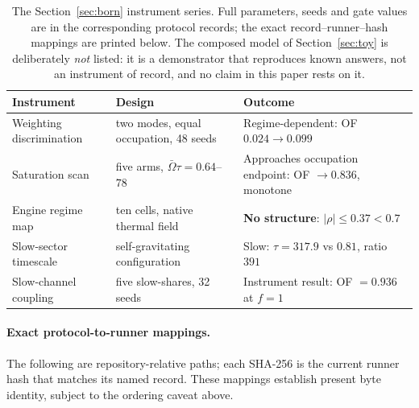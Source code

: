 \documentclass[11pt,a4paper]{article}
\theoremstyle{definition}
\theoremstyle{plain}
\theoremstyle{remark}
\begin{document}
\begin{table}[h!]
\centering\small
\begin{tabular}{p{} p{} p{}}
\toprule
Instrument & Design & Outcome \\
\midrule
Weighting discrimination &
two modes, equal occupation, 48 seeds &
Regime-dependent: OF $0.024\to0.099$ \\
Saturation scan &
five arms, $\bar\Omega\tau = 0.64$--$78$ &
Approaches occupation endpoint: OF $\to0.836$, monotone \\
Engine regime map &
ten cells, native thermal field &
\textbf{No structure}: $|\rho|\le0.37 < 0.7$ \\
Slow-sector timescale &
self-gravitating configuration &
Slow: $\tau=317.9$ vs $0.81$, ratio $391$ \\
Slow-channel coupling &
five slow-shares, 32 seeds &
Instrument result: OF $=0.936$ at $f=1$ \\
\bottomrule
\end{tabular}
\caption{The Section~\ref{sec:born} instrument series. Full parameters,
seeds and gate values are in the corresponding protocol records; the exact
record--runner--hash mappings are printed below. The composed
model of Section~\ref{sec:toy} is deliberately \emph{not} listed: it is a
demonstrator that reproduces known answers, not an instrument of record,
and no claim in this paper rests on it.}
\end{table}

\paragraph{Exact protocol-to-runner mappings.}
The following are repository-relative paths; each SHA-256 is the current
runner hash that matches its named record. These mappings establish present
byte identity, subject to the ordering caveat above.
\end{document}
